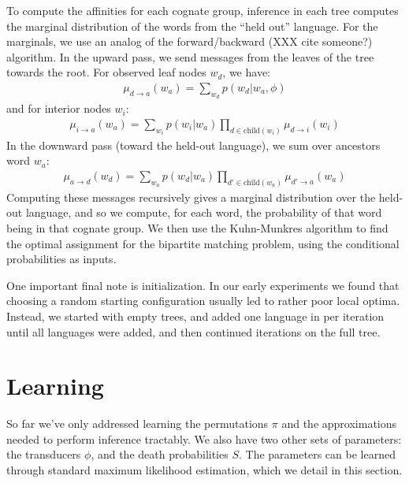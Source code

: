 \documentclass[11pt,a4paper]{article}
\begin{document}
To compute the affinities for each cognate group, inference in each
tree computes the marginal distribution of the words from the ``held
out'' language. For the marginals, we use an analog of the 
forward/backward (XXX cite someone?) algorithm. In the upward pass,
we send messages from the leaves of the tree towards the root. For observed
leaf nodes $w_d$, we have:
\begin{equation*}
  \begin{split}
    \mu_{d\to a}(w_a) = \sum_{w_d} p(w_d|w_a,\phi)
   \end{split}
 \end{equation*}
and for interior nodes $w_i$:
\begin{equation*}
  \begin{split}
    \mu_{i\to a}(w_a) = \sum_{w_i} p(w_i|w_a) \prod_{d \in \mathrm{child}(w_i)} \mu_{d \to i}(w_i) 
  \end{split}
\end{equation*}
In the downward pass (toward the held-out language), we sum over ancestors word $w_a$:
\begin{equation*}
  \begin{split}
    \mu_{a\to d}(w_d) = \sum_{w_a} p(w_d|w_a) \prod_{d' \in \mathrm{child}(w_a)} \mu_{d' \to a}(w_a) 
  \end{split}
\end{equation*}
Computing these messages recursively gives a marginal distribution
over the held-out language, and so we compute, for each word, the
probability of that word being in that cognate group. We then use
the Kuhn-Munkres algorithm \cite{Kuhn1955} to find the optimal
assignment for the bipartite matching problem, using the conditional
probabilities as inputs.

One important final note is initialization. In our early experiments
we found that choosing a random starting configuration usually led
to rather poor local optima. Instead, we started with empty trees,
and added one language in per iteration until all languages were
added, and then continued iterations on the full tree.

\section{Learning}
So far we've only addressed learning the permutations $\pi$ and
the approximations needed to perform inference tractably. We also
have two other sets of parameters: the transducers $\phi$, and the
death probabilities $S$. The parameters can be learned through
standard maximum likelihood estimation, which we detail in this
section.
\end{document}
